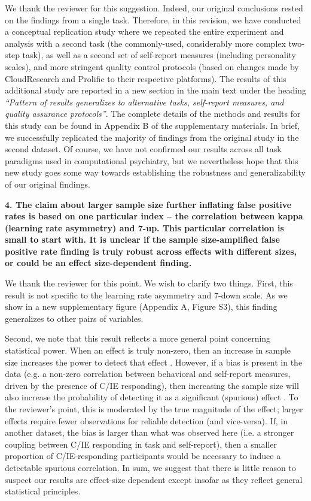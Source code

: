 \documentclass[a4paper,notitlepage,12pt]{article}
\begin{document}
We thank the reviewer for this suggestion. Indeed, our original conclusions rested on the findings from a single task. Therefore, in this revision, we have conducted a conceptual replication study where we repeated the entire experiment and analysis with a second task (the commonly-used, considerably more complex two-step task), as well as a second set of self-report measures (including personality scales), and more stringent quality control protocols (based on changes made by CloudResearch and Prolific to their respective platforms). The results of this additional study are reported in a new section in the main text under the heading \textit{``Pattern of results generalizes to alternative tasks, self-report measures, and quality assurance protocols''}. The complete details of the methods and results for this study can be found in Appendix B of the supplementary materials. In brief, we successfully replicated the majority of findings from the original study in the second dataset. Of course, we have not confirmed our results across all task paradigms used in computational psychiatry, but we nevertheless hope that this new study goes some way towards establishing the robustness and generalizability of our original findings. 

\textbf{4. The claim about larger sample size further inflating false positive rates is based on one particular index – the correlation between kappa (learning rate asymmetry) and 7-up. This particular correlation is small to start with. It is unclear if the sample size-amplified false positive rate finding is truly robust across effects with different sizes, or could be an effect size-dependent finding.}

We thank the reviewer for this point. We wish to clarify two things. First, this result is not specific to the learning rate asymmetry and 7-down scale. As we show in a new supplementary figure (Appendix A, Figure S3), this finding generalizes to other pairs of variables. 

Second, we note that this result reflects a more general point concerning statistical power. When an effect is truly non-zero, then an increase in sample size increases the power to detect that effect \cite{cohen2013statistical}. However, if a bias is present in the data (e.g. a non-zero correlation between behavioral and self-report measures, driven by the presence of C/IE responding), then increasing the sample size will also increase the probability of detecting it as a significant (spurious) effect \cite{meng2018statistical}. To the reviewer's point, this is moderated by the true magnitude of the effect; larger effects require fewer observations for reliable detection (and vice-versa). If, in another dataset, the bias is larger than what was observed here (i.e. a stronger coupling between C/IE responding in task and self-report), then a smaller proportion of C/IE-responding participants would be necessary to induce a detectable spurious correlation. In sum, we suggest that there is little reason to suspect our results are effect-size dependent except insofar as they reflect general statistical principles. 
\end{document}

